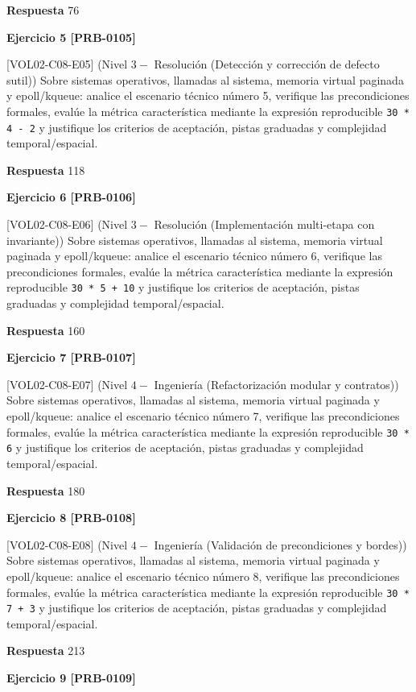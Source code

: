 \documentclass{book}
\begin{document}
\noindent\textbf{Respuesta} 76

\noindent\textbf{Ejercicio 5 [PRB-0105]}

[VOL02-C08-E05] (Nivel \(3 -\) Resolución (Detección y corrección de defecto sutil)) Sobre sistemas operativos, llamadas al sistema, memoria virtual paginada y epoll/kqueue: analice el escenario técnico número 5, verifique las precondiciones formales, evalúe la métrica característica mediante la expresión reproducible \texttt{30 * 4 - 2} y justifique los criterios de aceptación, pistas graduadas y complejidad temporal/espacial.

\noindent\textbf{Respuesta} 118

\noindent\textbf{Ejercicio 6 [PRB-0106]}

[VOL02-C08-E06] (Nivel \(3 -\) Resolución (Implementación multi-etapa con invariante)) Sobre sistemas operativos, llamadas al sistema, memoria virtual paginada y epoll/kqueue: analice el escenario técnico número 6, verifique las precondiciones formales, evalúe la métrica característica mediante la expresión reproducible \texttt{30 * 5 + 10} y justifique los criterios de aceptación, pistas graduadas y complejidad temporal/espacial.

\noindent\textbf{Respuesta} 160

\noindent\textbf{Ejercicio 7 [PRB-0107]}

[VOL02-C08-E07] (Nivel \(4 -\) Ingeniería (Refactorización modular y contratos)) Sobre sistemas operativos, llamadas al sistema, memoria virtual paginada y epoll/kqueue: analice el escenario técnico número 7, verifique las precondiciones formales, evalúe la métrica característica mediante la expresión reproducible \texttt{30 * 6} y justifique los criterios de aceptación, pistas graduadas y complejidad temporal/espacial.

\noindent\textbf{Respuesta} 180

\noindent\textbf{Ejercicio 8 [PRB-0108]}

[VOL02-C08-E08] (Nivel \(4 -\) Ingeniería (Validación de precondiciones y bordes)) Sobre sistemas operativos, llamadas al sistema, memoria virtual paginada y epoll/kqueue: analice el escenario técnico número 8, verifique las precondiciones formales, evalúe la métrica característica mediante la expresión reproducible \texttt{30 * 7 + 3} y justifique los criterios de aceptación, pistas graduadas y complejidad temporal/espacial.

\noindent\textbf{Respuesta} 213

\noindent\textbf{Ejercicio 9 [PRB-0109]}
\end{document}
